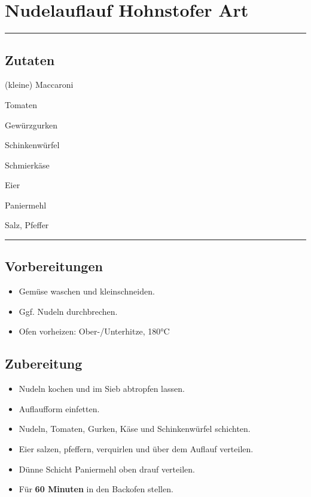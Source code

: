 \section*{Nudelauflauf Hohnstofer Art}

\bigbreak
\rule{\textwidth}{0.4pt}

\subsection*{Zutaten}

\begin{description}[align=right,leftmargin=!,labelwidth=\widthof{\bfseries xxPrisen}]
    \item[500g] (kleine) Maccaroni
    \item[4] Tomaten
    \item[6] Gewürzgurken
    \item[400g] Schinkenwürfel
    \item[200g] Schmierkäse
    \item[6] Eier
    \item[*] Paniermehl
    \item[Gewürze] Salz, Pfeffer
\end{description}


\rule{\textwidth}{0.4pt}


\subsection*{Vorbereitungen}

\begin{itemize}
    \item Gemüse waschen und kleinschneiden.
    \item Ggf. Nudeln durchbrechen.
    \item Ofen vorheizen: Ober-/Unterhitze, 180°C 
\end{itemize}


\bigbreak
\subsection*{Zubereitung}

\begin{itemize}
    \item Nudeln kochen und im Sieb abtropfen lassen.
    \item Auflaufform einfetten.
    \item Nudeln, Tomaten, Gurken, Käse und Schinkenwürfel schichten.
    \item Eier salzen, pfeffern, verquirlen und über dem Auflauf verteilen.
    \item Dünne Schicht Paniermehl oben drauf verteilen.
    \item Für \textbf{60 Minuten} in den Backofen stellen.
\end{itemize}

